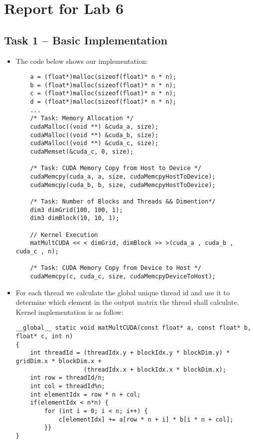 \documentclass[a4paper, DIV12, headsepline]{scrartcl}
\begin{document}
\section*{Report for Lab 6}
\subsection*{Task 1 -- Basic Implementation}
\begin{itemize}
\item The code below shows our implementation:
\begin{verbatim}
    a = (float*)malloc(sizeof(float)* n * n); 
    b = (float*)malloc(sizeof(float)* n * n); 
    c = (float*)malloc(sizeof(float)* n * n); 
    d = (float*)malloc(sizeof(float)* n * n);
    ...
    /* Task: Memory Allocation */
    cudaMalloc((void **) &cuda_a, size);
    cudaMalloc((void **) &cuda_b, size);
    cudaMalloc((void **) &cuda_c, size);
    cudaMemset(&cuda_c, 0, size);

    /* Task: CUDA Memory Copy from Host to Device */
    cudaMemcpy(cuda_a, a, size, cudaMemcpyHostToDevice);
    cudaMemcpy(cuda_b, b, size, cudaMemcpyHostToDevice);

    /* Task: Number of Blocks and Threads && Dimention*/
    dim3 dimGrid(100, 100, 1);
    dim3 dimBlock(10, 10, 1);

    // Kernel Execution
    matMultCUDA << < dimGrid, dimBlock >> >(cuda_a , cuda_b , cuda_c , n);

    /* Task: CUDA Memory Copy from Device to Host */
    cudaMemcpy(c, cuda_c, size, cudaMemcpyDeviceToHost);
\end{verbatim}

\item For each thread we calculate the global unique thread id and use it to determine which element in the output matrix the thread shall calculate. Kernel implementation is as follow:
\begin{verbatim}
__global__ static void matMultCUDA(const float* a, const float* b, float* c, int n)
{
    int threadId = (threadIdx.y + blockIdx.y * blockDim.y) * gridDim.x * blockDim.x +
                   (threadIdx.x + blockIdx.x * blockDim.x);
    int row = threadId/n;
    int col = threadId%n;
    int elementIdx = row * n + col;
    if(elementIdx < n*n) {
        for (int i = 0; i < n; i++) {
            c[elementIdx] += a[row * n + i] * b[i * n + col];
        }}
}
\end{verbatim}


\end{itemize}
\end{document}
